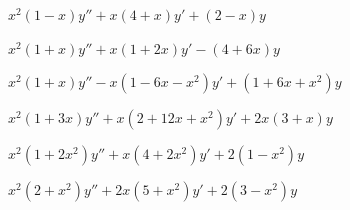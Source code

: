 \begin{exerciselist}

  \item\label{exer:7.1.21} $x^{2}(1-x)y''+x(4+x)y'+(2-x)y$

  \item\label{exer:7.1.22} $x^{2}(1+x)y''+x(1+2x)y'-(4+6x)y$

  \item\label{exer:7.1.23} $x^{2}(1+x)y''-x(1-6x-x^{2})y'+(1+6x+x^{2})y$

  \item\label{exer:7.1.24} $x^{2}(1+3x)y''+x(2+12x+x^{2})y'+2x(3+x)y$

  \item\label{exer:7.1.25} $x^{2}(1+2x^{2})y''+x(4+2x^{2})y'+2(1-x^{2})y$

  \item\label{exer:7.1.26} $x^{2}(2+x^{2})y''+2x(5+x^{2})y'+2(3-x^{2})y$
\end{exerciselist}

